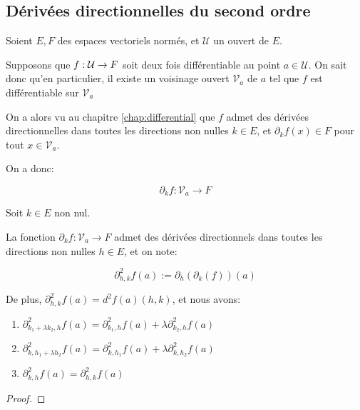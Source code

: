 \subsection{Dérivées directionnelles du second ordre}

Soient $E, F$ des espaces vectoriels normés, et $\mathcal{U}$ un ouvert de $E$.

Supposons que $f : \mathcal{U} \rightarrow F$ soit deux fois différentiable au
point $a \in \mathcal{U}$.
On sait donc qu'en particulier, il existe un voisinage ouvert $\mathcal{V}_{a}$ de $a$ tel
que $f$ est différentiable sur $\mathcal{V}_{a}$

On a alors vu au chapitre \ref{chap:differential} que $f$ admet des
dérivées directionnelles dans toutes les directions non nulles $k \in E$, et
$\partial_{k}{f} (x) \in F$ pour tout $x \in \mathcal{V}_{a}$.

On a donc:

\begin{equation}
	\partial_{k}f : \mathcal{V}_{a} \rightarrow F
\end{equation}

\begin{proposition}
	Soit $k \in E$ non nul.

	La fonction $\partial_{k}f : \mathcal{V}_{a} \rightarrow F$ admet des
	dérivées directionnels dans toutes les directions non nulles $h \in E$, et
	on note:

	\begin{equation}
		\partial_{h, k}^{2} f (a) := \partial_{h} (\partial_{k}(f)) (a)
	\end{equation}

	De plus, $\partial_{h, k}^{2} f (a) = d^{2}f(a) (h, k)$, et nous avons:

	\begin{enumerate}
		\item $\partial_{k_{1} + \lambda k_{2}, h}^{2} f(a) =
			\partial_{k_{1}, h}^{2}f(a) + \lambda \partial_{k_{2}, h}^{2} f(a)$
		\item $\partial_{k, h_{1} + \lambda h_{2}}^{2} f(a) = \partial_{k,
				h_{1}}^{2} f(a) + \lambda \partial_{k, h_{2}}^{2} f(a)$
		\item $\partial_{k, h}^{2} f(a) = \partial_{h, k}^{2} f(a)$
	\end{enumerate}
\end{proposition}

\ifdefined\outputproof
\begin{proof}

\end{proof}
\fi

